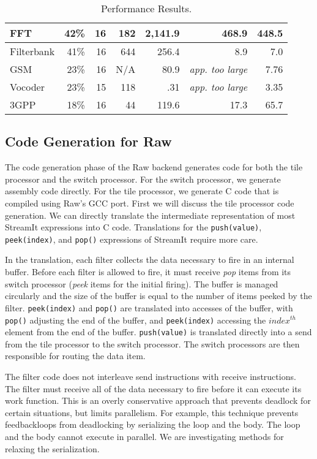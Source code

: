 \begin{table*}[t]
\begin{center}
\begin{tabular}{|l||r|r|r|r||r||r||}
FFT    & 42\% & 16  & 182 &  2,141.9 & 468.9 & 448.5  \\ \hline
Filterbank & 
       41\% & 16  &  644 &   256.4  & 8.9 & 7.0   \\ \hline
GSM    & 23\% & 16 & N/A &    80.9  & {\it app. too large} & 7.76 \\ \hline
Vocoder& 23\% & 15  & 118 &     .31  & {\it app. too large} & 3.35  \\ \hline
3GPP   & 18\% & 16  & 44 &   119.6  & 17.3  & 65.7   \\ \hline \hline
\end{tabular}
\vspace{-6pt}
\caption{\protect\small Performance Results.}
\label{tab:performance}
\end{center}
\vspace{-12pt}
\end{table*}

\subsection{Code Generation for Raw}

The code generation phase of the Raw backend generates code for both
the tile processor and the switch processor.  For the switch
processor, we generate assembly code directly.  For the tile
processor, we generate C code that is compiled using Raw's GCC port.
First we will discuss the tile processor code generation.  We can
directly translate the intermediate representation of most StreamIt
expressions into C code.  Translations for the {\tt push(value)}, {\tt
peek(index)}, and {\tt pop()} expressions of StreamIt require more
care.

In the translation, each filter collects the data necessary to fire in
an internal buffer.  Before each filter is allowed to fire, it must
receive \emph{pop} items from its switch processor (\emph{peek} items
for the initial firing).  The buffer is managed circularly and the
size of the buffer is equal to the number of items peeked by the
filter.  {\tt peek(index)} and {\tt pop()} are translated into
accesses of the buffer, with {\tt pop()} adjusting the end of the
buffer, and {\tt peek(index)} accessing the $index^{th}$ element from
the end of the buffer.  {\tt push(value)} is translated directly into
a send from the tile processor to the switch processor.  The switch
processors are then responsible for routing the data item.

The filter code does not interleave send instructions with receive
instructions.  The filter must receive all of the data necessary to
fire before it can execute its work function.  This is an overly
conservative approach that prevents deadlock for certain situations,
but limits parallelism.  For example, this technique prevents
feedbackloops from deadlocking by serializing the loop and the body.
The loop and the body cannot execute in parallel.  We are
investigating methods for relaxing the serialization.

